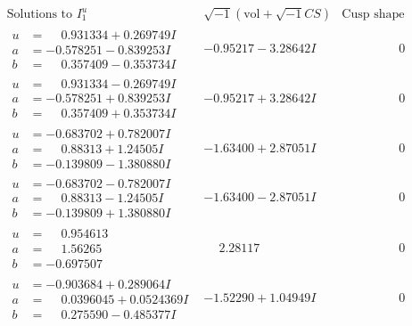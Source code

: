 \documentclass[1p]{elsarticle_modified}
\theoremstyle{definition}
\newcommand{\I}{\sqrt{-1}}
\begin{document}
$$\begin{array}{c|c|c}  
\text{Solutions to }I^u_{1}& \I (\text{vol} + \sqrt{-1}CS) & \text{Cusp shape}\\
 \hline 
\begin{aligned}
u &= \phantom{-}0.931334 + 0.269749 I \\
a &= -0.578251 - 0.839253 I \\
b &= \phantom{-}0.357409 - 0.353734 I\end{aligned}
 & -0.95217 - 3.28642 I & \phantom{-0.000000 } 0 \\ \hline\begin{aligned}
u &= \phantom{-}0.931334 - 0.269749 I \\
a &= -0.578251 + 0.839253 I \\
b &= \phantom{-}0.357409 + 0.353734 I\end{aligned}
 & -0.95217 + 3.28642 I & \phantom{-0.000000 } 0 \\ \hline\begin{aligned}
u &= -0.683702 + 0.782007 I \\
a &= \phantom{-}0.88313 + 1.24505 I \\
b &= -0.139809 - 1.380880 I\end{aligned}
 & -1.63400 + 2.87051 I & \phantom{-0.000000 } 0 \\ \hline\begin{aligned}
u &= -0.683702 - 0.782007 I \\
a &= \phantom{-}0.88313 - 1.24505 I \\
b &= -0.139809 + 1.380880 I\end{aligned}
 & -1.63400 - 2.87051 I & \phantom{-0.000000 } 0 \\ \hline\begin{aligned}
u &= \phantom{-}0.954613\phantom{ +0.000000I} \\
a &= \phantom{-}1.56265\phantom{ +0.000000I} \\
b &= -0.697507\phantom{ +0.000000I}\end{aligned}
 & \phantom{-}2.28117\phantom{ +0.000000I} & \phantom{-0.000000 } 0 \\ \hline\begin{aligned}
u &= -0.903684 + 0.289064 I \\
a &= \phantom{-}0.0396045 + 0.0524369 I \\
b &= \phantom{-}0.275590 - 0.485377 I\end{aligned}
 & -1.52290 + 1.04949 I & \phantom{-0.000000 } 0 \\ \hline\begin{aligned}

\end{aligned}
\end{array}$$
\end{document}
